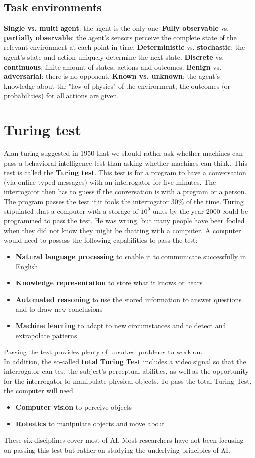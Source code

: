 \documentclass{report}
\begin{document}
\subsection{Task environments}
{\bf Single vs. multi agent}: the agent is the only one. {\bf Fully observable} vs. {\bf partially observable}: the agent's sensors perceive the complete state of the relevant environment at each point in time. {\bf Deterministic} vs. {\bf stochastic}: the agent's state and action uniquely determine the next state. {\bf Discrete} vs. {\bf continuous}: finite amount of states, actions and outcomes. {\bf Benign} vs. {\bf adversarial}: there is no opponent. {\bf Known vs. unknown}: the agent's knowledge about the "law of physics" of the environment, the outcomes (or probabilities) for all actions are given.

\section{Turing test}
Alan turing suggested in 1950 that we should rather ask whether machines can pass a behavioral intelligence test than asking whether machines can think.
This test is called the {\bf Turing test}. This test is for a program to have a conversation (via online typed messages) with an interrogator for five minutes. The interrogator then has to guess if the conversation is with a program or a person. The program passes the test if it fools the interrogator 30\% of the time.
Turing stipulated that a computer with a storage of $10^9$ units by the year 2000 could be programmed to pass the test.
He was wrong, but many people have been fooled when they did not know they might be chatting with a computer.
A computer would need to possess the following capabilities to pass the test:
\begin{itemize}
\item {\bf Natural language processing} to enable it to communicate successfully in English
\item {\bf Knowledge representation} to store what it knows or hears
\item {\bf Automated reasoning} to use the stored information to answer questions and to draw new conclusions
\item {\bf Machine learning} to adapt to new circumstances and to detect and extrapolate patterns
\end{itemize}
Passing the test provides plenty of unsolved problems to work on.\\
In addition, the so-called {\bf total Turing Test} includes a video signal so that the interrogator can test the subject's perceptual abilities, as well as the opportunity for the interrogator to manipulate physical objects.
To pass the total Turing Test, the computer will need
\begin{itemize}
\item {\bf Computer vision} to perceive objects
\item {\bf Robotics} to manipulate objects and move about
\end{itemize}
These six disciplines cover most of AI. Most researchers have not been focusing on passing this test but rather on studying the underlying principles of AI.
\end{document}

